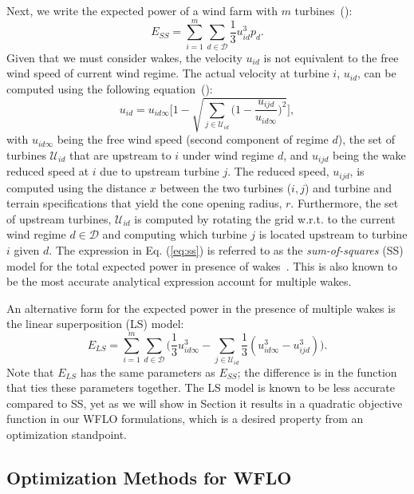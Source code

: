 \documentclass[preprint,12pt]{elsarticle}
\begin{document}
Next, we write 
the expected power of a wind farm with $m$ turbines~(\cite{Zhang2014}): \begin{equation} E_{SS} = \sum_{i=1}^m \sum_{d\in\mathcal{D}} \frac{1}{3} u_{id}^3p_d. \end{equation}
Given that we must consider wakes, the velocity $u_{id}$ is not equivalent to the free wind speed of current wind regime.
The actual velocity at turbine $i$, $u_{id}$, can be computed using the following equation~(\cite{Zhang2014}):
\begin{equation}
u_{id} = u_{id\infty} \Bigg[1 - \sqrt{\sum_{j\in\mathcal{U}_{id}} \bigg( 1-\frac{u_{ijd}}{u_{id\infty}} \bigg)^2}  \Bigg], \label{eq:ss}
\end{equation} with $u_{id\infty}$ being the free wind speed (second component of regime $d$), the set of turbines $\mathcal{U}_{id}$ that are upstream to $i$ 
under wind regime $d$, and $u_{ijd}$ being the wake 
reduced speed at $i$ due to upstream turbine $j$. 
The reduced speed, $u_{ijd}$, is computed using the distance $x$ between the two turbines ($i,j$)  and turbine and terrain specifications that yield the cone opening radius, $r$. Furthermore, the set of upstream turbines, $\mathcal{U}_{id}$ is computed  
by rotating the grid w.r.t. to the current wind regime $d \in \mathcal{D}$ and computing which turbine $j$ is located upstream to turbine $i$ given $d$. The expression in Eq. (\ref{eq:ss}) is referred to as the \emph{sum-of-squares} (SS) model for 
the total expected power in presence of wakes~\cite{Zhang2014}. This is also known to be the most accurate analytical expression account for multiple wakes.  

An alternative 
form for the expected power in the presence of multiple wakes is the linear superposition (LS) model: \begin{equation} \label{eq:ls}
E_{LS} = \sum_{i=1}^m \sum_{d\in\mathcal{D}} \Bigg(\frac{1}{3}u_{id\infty}^3 -\sum_{j\in\mathcal{U}_{id}} \frac{1}{3}(u_{id\infty}^3 - u_{ijd}^3)\Bigg).
\end{equation} Note that $E_{LS}$ has the same parameters as $E_{SS}$; the difference is in the function that ties these parameters together. 
The LS model is known to be less accurate compared to SS, yet as we will show in Section it 
results in a quadratic objective function in our WFLO formulations, which is a desired property from an optimization standpoint.
 

\subsection{Optimization Methods for WFLO}
\end{document}
